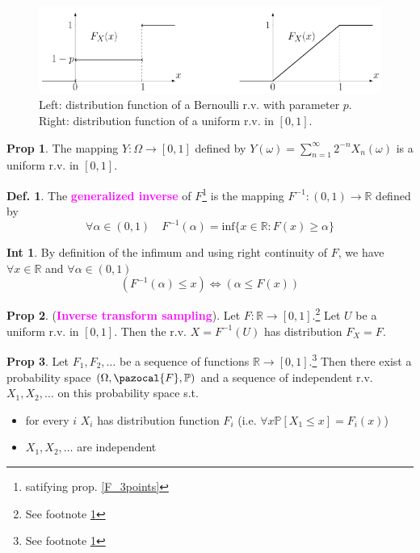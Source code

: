 \documentclass[8pt,a4paper,landscape]{article}
\theoremstyle{definition}
\newtheorem{definition}{Def.}[section]
\theoremstyle{example}
\theoremstyle{intuition}
\newtheorem*{intuition}{Int}
\theoremstyle{definition}
\newtheorem{proposition}{Prop}[section]
\newcommand{\Fb}{\pazocal{F}}
\newcommand{\mydef}[1]{\textcolor{magenta}{\textbf{#1}}}
\newcommand{\prob}[1]{\mathbb{P}\left[ #1 \right]}
\begin{document}
\begin{multicols}{3}
				\begin{figure}[H] 
					\includegraphics[width=\linewidth]{bernoulli_uniform_rv.png}
					\caption{Left: distribution function of a Bernoulli r.v. with parameter $p$. Right: distribution function of a uniform r.v. in $\left[0,1\right]$.}
				\end{figure}

				\begin{proposition}
					The mapping $Y : \Omega \to \left[0,1\right]$ defined by $Y(\omega) = \sum_{n=1}^{\infty}2^{-n}X_n(\omega)$ is a uniform r.v. in $\left[0,1\right]$.
				\end{proposition}

				\begin{definition}
					The \mydef{generalized inverse} of $F$\footnote{\label{note3}satifying prop. \ref{F_3points}} is the mapping $F^{-1} : (0,1) \to \mathbb{R}$ defined by
					$$
						\forall \alpha \in (0,1) \quad F^{-1}(\alpha) = \text{inf}\{x \in \mathbb{R} : F(x) \geq \alpha\}
					$$
				\end{definition}

				\begin{intuition}
					By definition of the infimum and using right continuity of $F$, we have $\forall x \in \mathbb{R}$ and $\forall \alpha \in (0,1)$
					$$
						(F^{-1}(\alpha) \leq x) \Longleftrightarrow (\alpha \leq F(x))
					$$
				\end{intuition}

				\begin{proposition}
					(\mydef{Inverse transform sampling}). Let $F : \mathbb{R} \to \left[0,1\right]$.\footnote{See footnote \ref{note3}} Let $U$ be a uniform r.v. in $\left[0,1\right]$. Then the r.v. $X = F^{-1}(U)$ has distribution $F_X = F$.
				\end{proposition}

				\begin{proposition}
					Let $F_1, F_2, \ldots$ be a sequence of functions $\mathbb{R} \to \left[0,1\right]$.\footnote{See footnote \ref{note3}} Then there exist a probability space $(\Omega, \Fb, \mathbb{P})$ and a sequence of independent r.v. $X_1, X_2, \ldots$ on this probability space s.t.
					\begin{itemize}
						\item for every $i$ $X_i$ has distribution function $F_i$ (i.e. $\forall x \prob{X_1 \leq x} = F_i(x)$)
						\item $X_1, X_2, \ldots$ are independent
					\end{itemize}
				\end{proposition}



\end{multicols}
\end{document}
